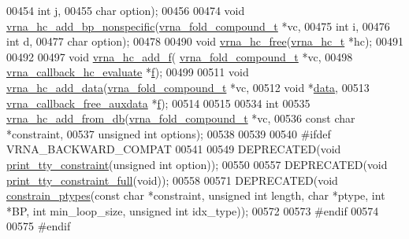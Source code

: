 \begin{DoxyCode}
00454                     \textcolor{keywordtype}{int} j,
00455                     \textcolor{keywordtype}{char} option);
00456 
00474 \textcolor{keywordtype}{void} \hyperlink{group__hard__constraints_gadeb1083d0dc928e1e931065aae54ad82}{vrna\_hc\_add\_bp\_nonspecific}(\hyperlink{group__fold__compound_structvrna__fc__s}{vrna\_fold\_compound\_t} *vc,
00475                                 \textcolor{keywordtype}{int} i,
00476                                 \textcolor{keywordtype}{int} d,
00477                                 \textcolor{keywordtype}{char} option);
00478 
00490 \textcolor{keywordtype}{void} \hyperlink{group__hard__constraints_ga696dcf77887d856c6f21ea266d8b9ca2}{vrna\_hc\_free}(\hyperlink{group__hard__constraints_structvrna__hc__s}{vrna\_hc\_t} *hc);
00491 
00492 
00497 \textcolor{keywordtype}{void} \hyperlink{constraints__hard_8h_af220427ba7ecc8e786a07b7799658f18}{vrna\_hc\_add\_f}( \hyperlink{group__fold__compound_structvrna__fc__s}{vrna\_fold\_compound\_t} *vc,
00498                     \hyperlink{group__hard__constraints_ga16eb71ac9a7a35369be2eaa9d8f8dfa0}{vrna\_callback\_hc\_evaluate} *\hyperlink{group__hard__constraints_a85714afbf27012165ec80c564bd62931}{f});
00499 
00511 \textcolor{keywordtype}{void} \hyperlink{constraints__hard_8h_a128920e0af52e4196a9d59fa13336c7c}{vrna\_hc\_add\_data}(\hyperlink{group__fold__compound_structvrna__fc__s}{vrna\_fold\_compound\_t} *vc,
00512                       \textcolor{keywordtype}{void} *\hyperlink{group__hard__constraints_acef3d722142cb5f4a8e114e5fbce3b1a}{data},
00513                       \hyperlink{group__fold__compound_ga3ae51bfd5fc3236652d1de4e3274b49b}{vrna\_callback\_free\_auxdata} *\hyperlink{group__hard__constraints_a85714afbf27012165ec80c564bd62931}{f});
00514 
00515 
00534 \textcolor{keywordtype}{int}
00535 \hyperlink{group__hard__constraints_ga5b4de3247b67358080c176b94591a8e6}{vrna\_hc\_add\_from\_db}(\hyperlink{group__fold__compound_structvrna__fc__s}{vrna\_fold\_compound\_t} *vc,
00536                     \textcolor{keyword}{const} \textcolor{keywordtype}{char} *constraint,
00537                     \textcolor{keywordtype}{unsigned} \textcolor{keywordtype}{int} options);
00538 
00539 
00540 \textcolor{preprocessor}{#ifdef  VRNA\_BACKWARD\_COMPAT}
00541 
00549 DEPRECATED(\textcolor{keywordtype}{void} \hyperlink{constraints__hard_8h_a4d167deb70bb51723e44374dc981deb2}{print\_tty\_constraint}(\textcolor{keywordtype}{unsigned} \textcolor{keywordtype}{int} option));
00550 
00557 DEPRECATED(\textcolor{keywordtype}{void} \hyperlink{constraints__hard_8h_ae8ae8a34962b9959be3f6c40f0a80ac1}{print\_tty\_constraint\_full}(\textcolor{keywordtype}{void}));
00558 
00571 DEPRECATED(\textcolor{keywordtype}{void} \hyperlink{constraints__hard_8h_a36c3a6c3218b041f992052767bc74549}{constrain\_ptypes}(\textcolor{keyword}{const} \textcolor{keywordtype}{char} *constraint, \textcolor{keywordtype}{unsigned} \textcolor{keywordtype}{int} length, \textcolor{keywordtype}{char} *ptype, \textcolor{keywordtype}{
      int} *BP, \textcolor{keywordtype}{int} min\_loop\_size, \textcolor{keywordtype}{unsigned} \textcolor{keywordtype}{int} idx\_type));
00572 
00573 \textcolor{preprocessor}{#endif}
00574 
00575 \textcolor{preprocessor}{#endif}
\end{DoxyCode}
